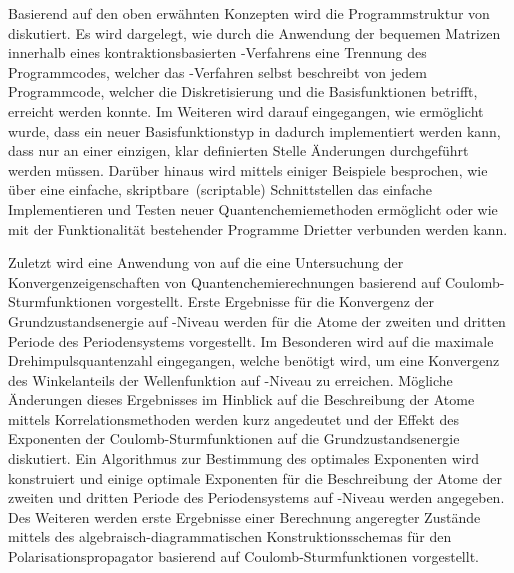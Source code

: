 Basierend auf den oben erwähnten Konzepten wird die Programmstruktur
von \molsturm diskutiert.
Es wird dargelegt, wie durch die Anwendung der bequemen Matrizen
innerhalb eines kontraktionsbasierten \SCF-Verfahrens
eine Trennung des Programmcodes,
welcher das \SCF-Verfahren selbst beschreibt
von jedem Programmcode, welcher die Diskretisierung und die Basisfunktionen betrifft,
erreicht werden konnte.
Im Weiteren wird darauf eingegangen,
wie ermöglicht wurde, dass ein neuer Basisfunktionstyp
in \molsturm dadurch implementiert werden kann,
dass nur an einer einzigen, klar definierten Stelle
Änderungen durchgeführt werden müssen.
Darüber hinaus wird mittels einiger Beispiele besprochen,
wie \molsturm über eine einfache, skriptbare~(scriptable) Schnittstellen
das einfache Implementieren und Testen neuer Quantenchemiemethoden
ermöglicht oder wie \molsturm mit der Funktionalität
bestehender Programme Drietter verbunden werden kann.

Zuletzt wird eine Anwendung von \molsturm auf
die eine Untersuchung der Konvergenzeigenschaften
von Quantenchemierechnungen basierend auf Coulomb-Sturmfunktionen vorgestellt.
Erste Ergebnisse für die Konvergenz der Grundzustandsenergie auf \HF-Niveau
werden für die Atome der zweiten und dritten Periode des Periodensystems vorgestellt.
Im Besonderen wird auf die maximale Drehimpulsquantenzahl eingegangen,
welche benötigt wird,
um eine Konvergenz des Winkelanteils der Wellenfunktion
auf \HF-Niveau zu erreichen.
Mögliche Änderungen dieses Ergebnisses im Hinblick auf die Beschreibung
der Atome mittels Korrelationsmethoden werden kurz angedeutet
und der Effekt des Exponenten der Coulomb-Sturmfunktionen
auf die Grundzustandsenergie diskutiert.
Ein Algorithmus zur Bestimmung des optimales Exponenten wird konstruiert
und einige optimale Exponenten für die Beschreibung der Atome
der zweiten und dritten Periode des Periodensystems
auf \HF-Niveau werden angegeben.
Des Weiteren werden erste Ergebnisse einer Berechnung angeregter Zustände
mittels des algebraisch-diagrammatischen Konstruktionsschemas
für den Polarisationspropagator basierend auf Coulomb-Sturmfunktionen vorgestellt.
